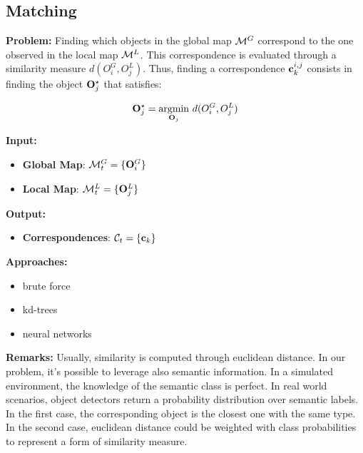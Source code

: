 \documentclass{article}
\begin{document}
	\subsection{Matching} 
	
	{\bf Problem: }	Finding which objects in the global map $\mathcal{M}^G$ correspond to the one observed in the local map $\mathcal{M}^L$. This correspondence is evaluated through a similarity measure $d(O_i^G,O_j^L)$. Thus, finding a correspondence $\mathbf{c}^{i,j}_k$ consists in finding the object $\mathbf{O}_j^\star$ that satisfies:
	
	\begin{equation}
		\mathbf{O}_j^\star = \operatorname*{argmin}_{\mathbf{O}_j} \, d(O_i^G,O_j^L)
	\end{equation}
		
	\noindent
	{\bf Input: }
	\begin{itemize}
		\item {\bf Global Map}: $\mathcal{M}^G_t = \{ \mathbf{O}_i^G \}$
		\item {\bf Local Map}: $\mathcal{M}^L_t = \{ \mathbf{O}_j^L \}$
	\end{itemize}
	\noindent
	{\bf Output: }
	\begin{itemize}
		\item {\bf Correspondences}: $\mathcal{C}_t = \{\mathbf{c}_k\}$		
	\end{itemize}
	\noindent
	{\bf Approaches: }
	\begin{itemize}
		\item brute force
		\item kd-trees
		\item neural networks
	\end{itemize}
	\noindent
	{\bf Remarks: }
	Usually, similarity is computed through euclidean distance. In our problem, it's possible to leverage also semantic information. In a simulated environment, the knowledge of the semantic class is perfect. In real world scenarios, object detectors return a probability distribution over semantic labels. In the first case, the corresponding object is the closest one with the same type. In the second case, euclidean distance could be weighted with class probabilities to represent a form of similarity measure.
		
		
	
\end{document}
